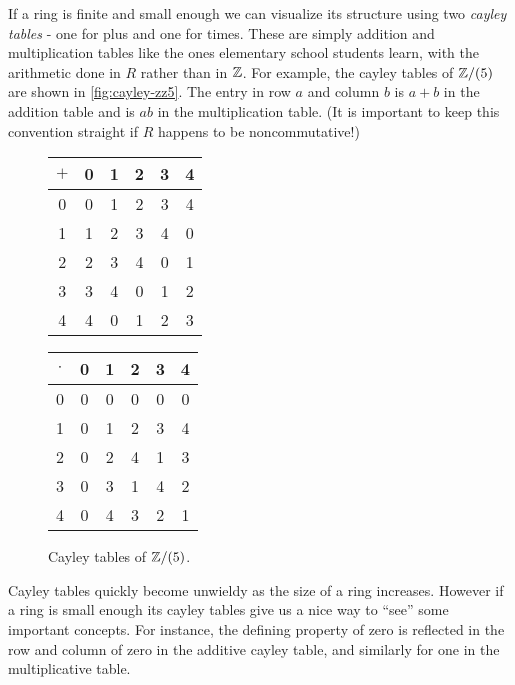 If a ring is finite and small enough we can visualize its structure using two \emph{cayley tables}  - one for plus and one for times. These are simply addition and multiplication tables like the ones elementary school students learn, with the arithmetic done in \(R\) rather than in \(\mathbb{Z}\). For example, the cayley tables of \(\mathbb{Z}/(5)\) are shown in \autoref{fig:cayley-zz5}. The entry in row \(a\) and column \(b\) is \(a+b\) in the addition table and is \(ab\) in the multiplication table. (It is important to keep this convention straight if \(R\) happens to be noncommutative!)
\begin{figure}[h!]
\begin{center}
\begin{tabular}{c|ccccc}
\(+\)
  & 0 & 1 & 2 & 3 & 4 \\ \hline
0 & 0 & 1 & 2 & 3 & 4 \\
1 & 1 & 2 & 3 & 4 & 0 \\
2 & 2 & 3 & 4 & 0 & 1 \\
3 & 3 & 4 & 0 & 1 & 2 \\
4 & 4 & 0 & 1 & 2 & 3
\end{tabular}
\quad\quad
\begin{tabular}{c|ccccc}
\(\cdot\)
  & 0 & 1 & 2 & 3 & 4 \\ \hline
0 & 0 & 0 & 0 & 0 & 0 \\
1 & 0 & 1 & 2 & 3 & 4 \\
2 & 0 & 2 & 4 & 1 & 3 \\
3 & 0 & 3 & 1 & 4 & 2 \\
4 & 0 & 4 & 3 & 2 & 1
\end{tabular}
\caption{Cayley tables of \(\mathbb{Z}/(5)\). \label{fig:cayley-zz5}}
\end{center}
\end{figure}
Cayley tables quickly become unwieldy as the size of a ring increases. However if a ring is small enough its cayley tables give us a nice way to ``see'' some important concepts. For instance, the defining property of zero is reflected in the row and column of zero in the additive cayley table, and similarly for one in the multiplicative table.

